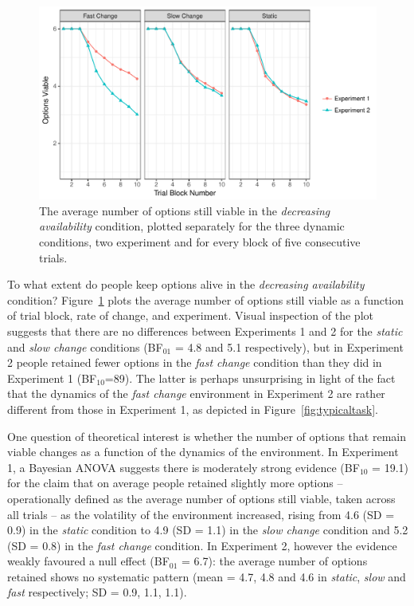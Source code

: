 \documentclass[a4paper,doc,natbib]{apa6}
\begin{document}
\begin{figure}[t]
\centering
\includegraphics[width=.9\textwidth]{optionsretained.pdf}
\caption{\small{The average number of options still viable in the {\it decreasing availability} condition, plotted separately for the three dynamic conditions, two experiment and for every block of five consecutive trials.}}
\label{fig:optsleft_human}
\end{figure}

To what extent do people keep options alive in the {\it decreasing availability} condition? Figure~\ref{fig:optsleft_human} plots the average number of options still viable as a function of trial block, rate of change, and experiment. Visual inspection of the plot suggests that there are no differences between Experiments 1 and 2 for the \textit{static} and \textit{slow change} conditions (BF$_{01}$ = 4.8 and 5.1 respectively), but in Experiment 2 people retained fewer options in the \textit{fast change} condition than they did in Experiment 1 (BF$_{10}$=89). The latter is perhaps unsurprising in light of the fact that the dynamics of the \textit{fast change} environment in Experiment 2 are rather different from those in Experiment 1, as depicted in Figure~\ref{fig:typicaltask}.

One question of theoretical interest is whether the number of options that remain viable changes as a function of the dynamics of the environment. In Experiment 1, a Bayesian ANOVA suggests there is moderately strong evidence (BF$_{10}$ = 19.1) for the claim that on average people retained slightly more options -- operationally defined as the average number of options still viable, taken across all trials -- as the volatility of the environment increased, rising from 4.6 (SD = 0.9) in the \textit{static} condition to 4.9 (SD = 1.1) in the \textit{slow change} condition and 5.2 (SD = 0.8) in the \textit{fast change} condition. In Experiment 2, however the evidence weakly favoured a null effect (BF$_{01}$ = 6.7): the average number of options retained shows no systematic pattern (mean = 4.7, 4.8 and 4.6 in \textit{static}, \textit{slow} and \textit{fast} respectively; SD = 0.9, 1.1, 1.1).
\end{document}
